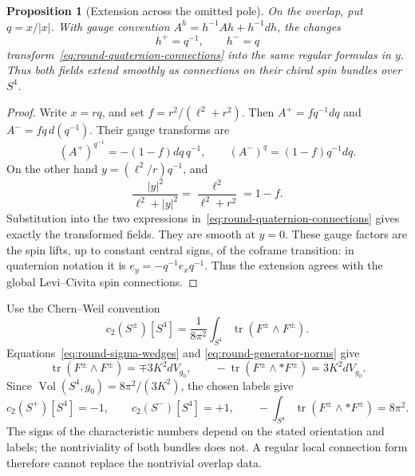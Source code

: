 \documentclass[11pt]{article}
\numberwithin{equation}{section}
\newtheorem{proposition}[theorem]{Proposition}
\theoremstyle{definition}
\theoremstyle{remark}
\begin{document}
\begin{proposition}[Extension across the omitted pole]
\label{prop:round-patching}
On the overlap, put $q=x/|x|$.  With gauge convention
$A^h=h^{-1}Ah+h^{-1}dh$, the changes
\begin{equation}
 h^+=q^{-1},\qquad h^-=q
 \label{eq:round-clutching}
\end{equation}
transform~\eqref{eq:round-quaternion-connections} into the same regular
formulas in $y$.  Thus both fields extend smoothly as connections on their
chiral spin bundles over $S^4$.
\end{proposition}

\begin{proof}
Write $x=rq$, and set $f=r^2/(\ell^2+r^2)$.  Then
$A^+=f q^{-1}dq$ and $A^-=f q\,d(q^{-1})$.  Their gauge transforms are
\[
 (A^+)^{q^{-1}}=-(1-f)dq\,q^{-1},
 \qquad
 (A^-)^q=(1-f)q^{-1}dq.
\]
On the other hand $y=(\ell^2/r)q^{-1}$, and
\[
 \frac{|y|^2}{\ell^2+|y|^2}
 =\frac{\ell^2}{\ell^2+r^2}=1-f.
\]
Substitution into the two expressions in~\eqref{eq:round-quaternion-connections}
gives exactly the transformed fields.  They are smooth at $y=0$.
These gauge factors are the spin lifts, up to constant central signs, of
the coframe transition: in quaternion notation it is
$e_y=-q^{-1}e_xq^{-1}$.  Thus the extension agrees with the global
Levi--Civita spin connections.
\end{proof}

Use the Chern--Weil convention
\begin{equation}
 c_2(S^\pm)[S^4]
 =\frac1{8\pi^2}\int_{S^4}\operatorname{tr}(F^\pm\wedge F^\pm).
 \label{eq:round-c2-convention}
\end{equation}
Equations~\eqref{eq:round-sigma-wedges} and
\eqref{eq:round-generator-norms} give
\begin{equation}
 \operatorname{tr}(F^\pm\wedge F^\pm)=\mp3K^2dV_{g_0},
 \qquad
 -\operatorname{tr}(F^\pm\wedge *F^\pm)=3K^2dV_{g_0}.
 \label{eq:round-characteristic-densities}
\end{equation}
Since $\operatorname{Vol}(S^4,g_0)=8\pi^2/(3K^2)$, the chosen labels give
\begin{equation}
 c_2(S^+)[S^4]=-1,\qquad c_2(S^-)[S^4]=+1,
 \qquad
 -\int_{S^4}\operatorname{tr}(F^\pm\wedge *F^\pm)=8\pi^2.
 \label{eq:round-charge-energy}
\end{equation}
The signs of the characteristic numbers depend on the stated orientation
and labels; the nontriviality of both bundles does not.  A regular local
connection form therefore cannot replace the nontrivial overlap data.
\end{document}
